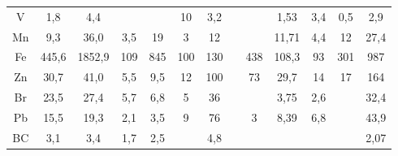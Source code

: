 \begin{tabular}{ccccccccccccc}
V        & 1,8        & 4,4        &                  &              & 10     & 3,2   &       &       & 1,53   & 3,4     & 0,5       & 2,9      \\
Mn       & 9,3        & 36,0       & 3,5              & 19           & 3      & 12    &       &       & 11,71  & 4,4     & 12        & 27,4     \\
Fe       & 445,6      & 1852,9     & 109              & 845          & 100    & 130   &       & 438   & 108,3  & 93      & 301       & 987      \\
Zn       & 30,7       & 41,0       & 5,5              & 9,5          & 12     & 100   &       & 73    & 29,7   & 14      & 17        & 164      \\
Br       & 23,5       & 27,4       & 5,7              & 6,8          & 5      & 36    &       &       & 3,75   & 2,6     &           & 32,4     \\
Pb       & 15,5       & 19,3       & 2,1              & 3,5          & 9      & 76    &       & 3     & 8,39   & 6,8     &           & 43,9     \\
BC       & 3,1        & 3,4        & 1,7              & 2,5          &        & 4,8   &       &       &        &         &           & 2,07    \\
\hline
\end{tabular}

